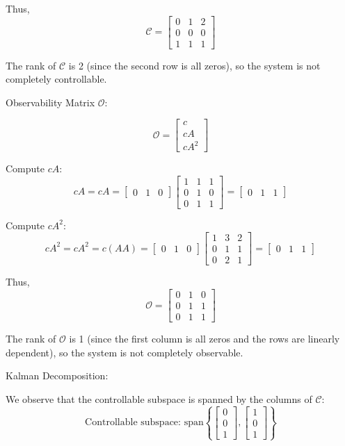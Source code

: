 \documentclass[12pt]{article}
\begin{document}
Thus,
\[
\mathcal{C} = \begin{bmatrix}
0 & 1 & 2 \\
0 & 0 & 0 \\
1 & 1 & 1
\end{bmatrix}
\]

The rank of $\mathcal{C}$ is 2 (since the second row is all zeros), so the system is not completely controllable.

Observability Matrix $\mathcal{O}$:

\[
\mathcal{O} = \begin{bmatrix} c \\ cA \\ cA^2 \end{bmatrix}
\]

Compute $cA$:
\[
cA = c A = \begin{bmatrix} 0 & 1 & 0 \end{bmatrix} \begin{bmatrix}
1 & 1 & 1 \\
0 & 1 & 0 \\
0 & 1 & 1
\end{bmatrix} = \begin{bmatrix} 0 & 1 & 1 \end{bmatrix}
\]

Compute $cA^2$:
\[
cA^2 = c A^2 = c (A A) = \begin{bmatrix} 0 & 1 & 0 \end{bmatrix} \begin{bmatrix}
1 & 3 & 2 \\
0 & 1 & 1 \\
0 & 2 & 1
\end{bmatrix} = \begin{bmatrix} 0 & 1 & 1 \end{bmatrix}
\]

Thus,
\[
\mathcal{O} = \begin{bmatrix}
0 & 1 & 0 \\
0 & 1 & 1 \\
0 & 1 & 1
\end{bmatrix}
\]

The rank of $\mathcal{O}$ is 1 (since the first column is all zeros and the rows are linearly dependent), so the system is not completely observable.

Kalman Decomposition:

We observe that the controllable subspace is spanned by the columns of $\mathcal{C}$:
\[
\text{Controllable subspace: } \text{span}\left\{ \begin{bmatrix} 0 \\ 0 \\ 1 \end{bmatrix}, \begin{bmatrix} 1 \\ 0 \\ 1 \end{bmatrix} \right\}
\]
\end{document}
